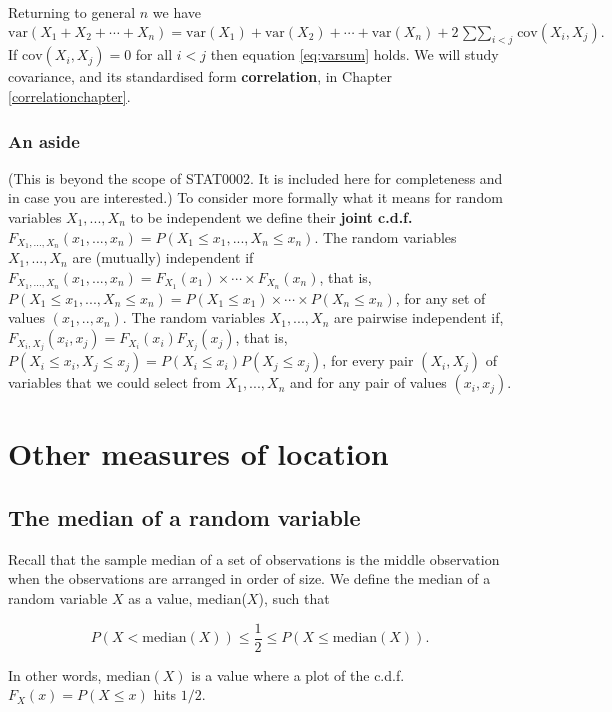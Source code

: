 \documentclass[
  british,
  11pt,
  openany, a4paper]{book}
\begin{document}
Returning to general \(n\) we have
\[ \mathrm{var}(X_1 + X_2 + \cdots + X_n) = \mathrm{var}(X_1) + \mathrm{var}(X_2) + \cdots + \mathrm{var}(X_n) + 2 \mathop{\sum\sum}_{i < j} \mathrm{cov}(X_i,X_j). \]
If \(\mathrm{cov}(X_i,X_j)=0\) for all \(i < j\) then equation \eqref{eq:varsum} holds. We will study covariance, and its standardised form \textbf{correlation}, in Chapter \ref{correlationchapter}.

\subsubsection{An aside}\label{an-aside}

(This is beyond the scope of STAT0002. It is included here for completeness and in case you are interested.) To consider more formally what it means for random variables \(X_1, ..., X_n\) to be independent we define their \textbf{joint c.d.f.} \(F_{X_1, ..., X_n}(x_1, ..., x_n) = P(X_1 \leq x_1, ..., X_n \leq x_n)\). The random variables \(X_1, ..., X_n\) are (mutually) independent if \(F_{X_1, ..., X_n}(x_1, ..., x_n) = F_{X_1}(x_1) \times \cdots \times F_{X_n}(x_n)\), that is, \(P(X_1 \leq x_1, ..., X_n \leq x_n) = P(X_1 \leq x_1) \times \cdots \times P(X_n \leq x_n)\), for any set of values \((x_1, .., x_n)\). The random variables \(X_1, ..., X_n\) are pairwise independent if, \(F_{X_i, X_j}(x_i, x_j) = F_{X_i}(x_i) F_{X_j}(x_j)\), that is, \(P(X_i \leq x_i, X_j \leq x_j) = P(X_i \leq x_i) P(X_j \leq x_j)\), for every pair \((X_i, X_j)\) of variables that we could select from \(X_1, ..., X_n\) and for any pair of values \((x_i, x_j)\).

\section{Other measures of location}\label{locations}

\subsection{The median of a random variable}\label{the-median-of-a-random-variable}

Recall that the sample median of a set of observations is the middle observation when the observations are arranged in order of size. We define the median of a random variable \(X\) as a value, median(\(X\)), such that

\[ P(X < \mathrm{median}(X)) \leq \frac12 \leq P(X \leq \mathrm{median}(X)). \]

In other words, \(\mathrm{median}(X)\) is a value where a plot of the c.d.f. \(F_X(x)=P(X \leq x)\) hits \(1/2\).
\end{document}
